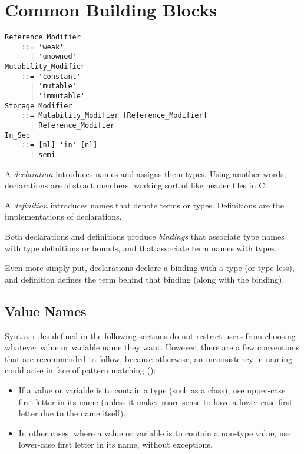 
\chapter{Common Building Blocks}

\minitoc

\newpage

\grammar\begin{lstlisting}
Reference_Modifier
    ::= 'weak'
      | 'unowned'
Mutability_Modifier  
    ::= 'constant' 
      | 'mutable' 
      | 'immutable'
Storage_Modifier
    ::= Mutability_Modifier [Reference_Modifier]
      | Reference_Modifier
In_Sep
    ::= [nl] 'in' [nl] 
      | semi
\end{lstlisting}

A {\em declaration} introduces names and assigns them types. Using another words, declarations are abstract members, working sort of like header files in C. 

A {\em definition} introduces names that denote terms or types. Definitions are the implementations of declarations. 

Both declarations and definitions produce {\em bindings} that associate type names with type definitions or bounds, and that associate term names with types. 

Even more simply put, declarations declare a binding with a type (or type-less), and definition defines the term behind that binding (along with the binding). 





\section{Value Names}
\label{sec:val-var-names}

Syntax rules defined in the following sections do not restrict users from choosing whatever value or variable name they want. However, there are a few conventions that are recommended to follow, because otherwise, an inconsistency in naming could arise in face of pattern matching ():

\begin{itemize}
  \item If a value or variable is to contain a type (such as a class), use upper-case first letter in its name (unless it makes more sense to have a lower-case first letter due to the name itself). 
  \item In other cases, where a value or variable is to contain a non-type value, use lower-case first letter in its name, without exceptions. 
\end{itemize}

